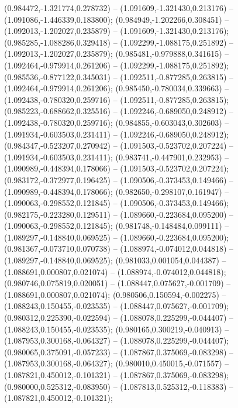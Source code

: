  (0.984472,-1.321774,0.278732) -- (1.091609,-1.321430,0.213176) -- (1.091086,-1.446339,0.183800);
 (0.984949,-1.202266,0.308451) -- (1.092013,-1.202027,0.235879) -- (1.091609,-1.321430,0.213176);
 (0.985285,-1.088286,0.329418) -- (1.092299,-1.088175,0.251892) -- (1.092013,-1.202027,0.235879);
 (0.985481,-0.979888,0.341615) -- (1.092464,-0.979914,0.261206) -- (1.092299,-1.088175,0.251892);
 (0.985536,-0.877122,0.345031) -- (1.092511,-0.877285,0.263815) -- (1.092464,-0.979914,0.261206);
 (0.985450,-0.780034,0.339663) -- (1.092438,-0.780320,0.259716) -- (1.092511,-0.877285,0.263815);
 (0.985223,-0.688662,0.325516) -- (1.092246,-0.689050,0.248912) -- (1.092438,-0.780320,0.259716);
 (0.984855,-0.603043,0.302603) -- (1.091934,-0.603503,0.231411) -- (1.092246,-0.689050,0.248912);
 (0.984347,-0.523207,0.270942) -- (1.091503,-0.523702,0.207224) -- (1.091934,-0.603503,0.231411);
 (0.983741,-0.447901,0.232953) -- (1.090989,-0.448394,0.178066) -- (1.091503,-0.523702,0.207224);
 (0.983172,-0.372977,0.196425) -- (1.090506,-0.373453,0.149466) -- (1.090989,-0.448394,0.178066);
 (0.982650,-0.298107,0.161947) -- (1.090063,-0.298552,0.121845) -- (1.090506,-0.373453,0.149466);
 (0.982175,-0.223280,0.129511) -- (1.089660,-0.223684,0.095200) -- (1.090063,-0.298552,0.121845);
 (0.981748,-0.148484,0.099111) -- (1.089297,-0.148840,0.069525) -- (1.089660,-0.223684,0.095200);
 (0.981367,-0.073710,0.070738) -- (1.088974,-0.074012,0.044818) -- (1.089297,-0.148840,0.069525);
 (0.981033,0.001054,0.044387) -- (1.088691,0.000807,0.021074) -- (1.088974,-0.074012,0.044818);
 (0.980746,0.075819,0.020051) -- (1.088447,0.075627,-0.001709) -- (1.088691,0.000807,0.021074);
 (0.980506,0.150594,-0.002275) -- (1.088243,0.150455,-0.023535) -- (1.088447,0.075627,-0.001709);
 (0.980312,0.225390,-0.022594) -- (1.088078,0.225299,-0.044407) -- (1.088243,0.150455,-0.023535);
 (0.980165,0.300219,-0.040913) -- (1.087953,0.300168,-0.064327) -- (1.088078,0.225299,-0.044407);
 (0.980065,0.375091,-0.057233) -- (1.087867,0.375069,-0.083298) -- (1.087953,0.300168,-0.064327);
 (0.980010,0.450015,-0.071557) -- (1.087821,0.450012,-0.101321) -- (1.087867,0.375069,-0.083298);
 (0.980000,0.525312,-0.083950) -- (1.087813,0.525312,-0.118383) -- (1.087821,0.450012,-0.101321);
